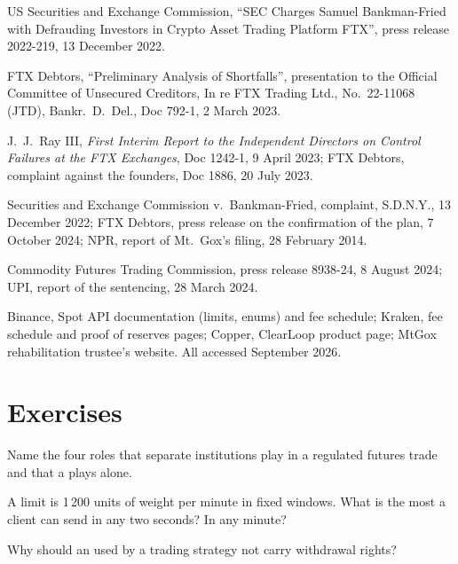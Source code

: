 \begin{omsources}
\item US Securities and Exchange Commission, ``SEC Charges Samuel Bankman-Fried with Defrauding Investors in
Crypto Asset Trading Platform FTX'', press release 2022-219, 13 December 2022.
\item FTX Debtors, ``Preliminary Analysis of Shortfalls'', presentation to the Official Committee of Unsecured
Creditors, In re FTX Trading Ltd., No.\ 22-11068 (JTD), Bankr.\ D.\ Del., Doc 792-1, 2 March 2023.
\item J.~J.~Ray III, \emph{First Interim Report to the Independent Directors on Control Failures at the FTX
Exchanges}, Doc 1242-1, 9 April 2023; FTX Debtors, complaint against the founders, Doc 1886, 20 July 2023.
\item Securities and Exchange Commission v.\ Bankman-Fried, complaint, S.D.N.Y., 13 December 2022; FTX Debtors, press
release on the confirmation of the plan, 7 October 2024; NPR, report of Mt.~Gox's filing, 28 February 2014.
\item Commodity Futures Trading Commission, press release 8938-24, 8 August 2024; UPI, report of the
sentencing, 28 March 2024.
\item Binance, Spot API documentation (limits, enums) and fee schedule; Kraken, fee schedule and proof of
reserves pages; Copper, ClearLoop product page; MtGox rehabilitation trustee's website. All accessed
September 2026.
\end{omsources}

\section{Exercises}

\begin{exercise}[$\star$]\label{exo:m3:centralised-exchanges:1}
Name the four roles that separate institutions play in a regulated futures trade and that a  plays alone.
\end{exercise}

\begin{exercise}[$\star$]\label{exo:m3:centralised-exchanges:2}
A limit is 1\,200 units of weight per minute in fixed windows. What is the most a client can send in any
two seconds? In any minute?
\end{exercise}

\begin{exercise}[$\star$]\label{exo:m3:centralised-exchanges:3}
Why should an  used by a trading strategy not carry withdrawal rights?
\end{exercise}


